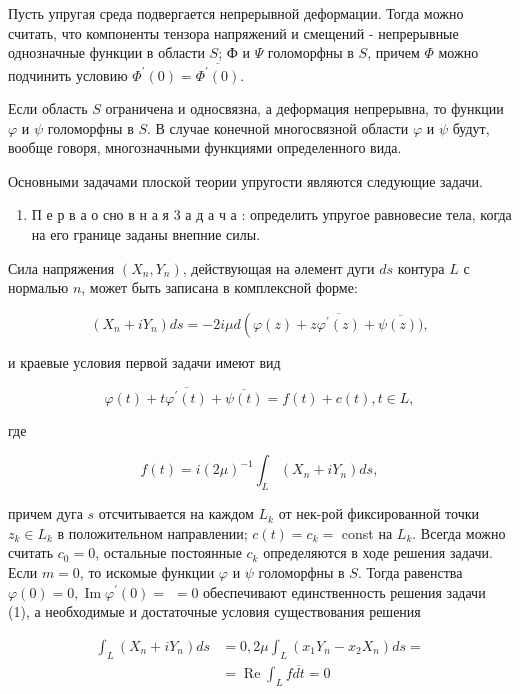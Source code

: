 \documentclass[10pt]{article}
\begin{document}
Пусть упругая среда подвергается непрерывной деформации. Тогда можно считать, что компоненты тензора напряжений и смещений - непрерывные однозначные функции в области $S$; Ф и $\Psi$ голоморфны в $S$, причем $\Phi$ можно подчинить условию $\Phi^{\prime}(0)=\overline{\Phi^{\prime}(0)}$.



Если область $S$ ограничена и односвязна, а деформация непрерывна, то функции $\varphi$ и $\psi$ голоморфны в $S$. В случае конечной многосвязной области $\varphi$ и $\psi$ будут, вообще говоря, многозначными функциями определенного вида.



Основными задачами плоской теории упругости являются следующие задачи.



\begin{enumerate}

  \item П е р в а о сно в н а я 3 а д а ч а : определить упругое равновесие тела, когда на его границе заданы внепние силы.

\end{enumerate}



Сила напряжения $\left(X_{n}, Y_{n}\right)$, действующая на әлемент дуги $d s$ контура $L$ с нормалью $n$, может быть записана в комплексной форме:



\[

\left(X_{n}+i Y_{n}\right) d s=-2 i \mu d\left(\varphi(z)+z \overline{\varphi^{\prime}(z)}+\overline{\psi(z))},\right.

\]



и краевые условия первой задачи имеют вид



\[

\varphi(t)+t \overline{\varphi^{\prime}(t)}+\overline{\psi(t)}=f(t)+c(t), t \in L,

\]



где



\[

f(t)=i(2 \mu)^{-1} \int_{L}\left(X_{n}+i Y_{n}\right) d s,

\]



причем дуга $s$ отсчитывается на каждом $L_{k}$ от нек-рой фиксированной точки $z_{k} \in L_{k}$ в положительном направлении; $c(t)=c_{k}=$ const на $L_{k}$. Всегда можно считать $c_{0}=0$, остальные постоянные $c_{k}$ определяются в ходе решения задачи. Если $m=0$, то искомые функции $\varphi$ и $\psi$ голоморфны в $S$. Тогда равенства $\varphi(0)=0, \operatorname{Im} \varphi^{\prime}(0)=$ $=0$ обеспечивают единственность решения задачи (1), а необходимые и достаточные условия существования решения



\[

\begin{aligned}

\int_{L}\left(X_{n}+i Y_{n}\right) d s & =0,2 \mu \int_{L}\left(x_{1} Y_{n}-x_{2} X_{n}\right) d s= \\

& =\operatorname{Re} \int_{L} f \overline{d t}=0

\end{aligned}

\]
\end{document}
